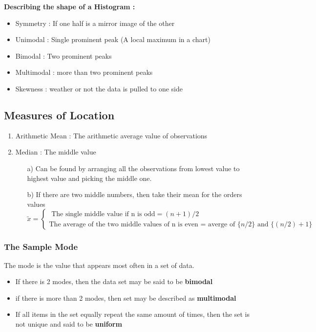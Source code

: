 \documentclass{article}
\begin{document}
\textbf{Describing the shape of a Histogram :}
\begin{itemize}
\item Symmetry : If one half is a mirror image of the other
\item Unimodal : Single prominent peak (A local maximum in a chart)
\item Bimodal : Two prominent peaks 
\item Multimodal : more than two prominent peaks
\item Skewness : weather or not the data is pulled to one side
\end{itemize}

\subsection{Measures of Location}
\begin{enumerate}
\item Arithmetic Mean : The arithmetic average value of observations 
\item Median : The middle value 
\begin{itemize}
\item[a)] Can be found by arranging all the observations from lowest value to highest value and picking the middle one.
\item[b)] If there are two middle numbers, then take their mean for the orders values 
$$ \widetilde{x} = \begin{cases} \text{ The single middle value if n is odd} = (n+1) / 2 \\ \text{The average of the two middle values of n is even = averge of } \{n/2\} \text{ and } \{(n/2) + 1\}\end{cases}$$
\end{itemize} 
\end{enumerate}

\subsubsection{The Sample Mode}
The mode is the value that appears most often in a set of data.

\begin{itemize}
\item If there is 2 modes, then the data set may be said to be \textbf{bimodal}
\item if there is more than 2 modes, then set may be described as  \textbf{multimodal} 
\item If all items in the set equally repeat the same amount of times, then the set is not unique and said to be \textbf{uniform} 
\end{itemize}
\end{document}
